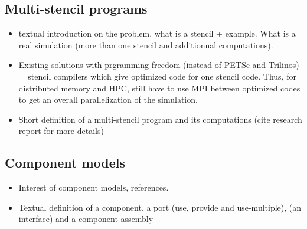 \subsection{Multi-stencil programs}
\label{sect:multistencil}
\begin{itemize}
\item textual introduction on the problem, what is a stencil + example. What is a real simulation (more than one stencil and additionnal computations). 
\item Existing solutions with prgramming freedom (instead of PETSc and Trilinos) = stencil compilers which give optimized code for one stencil code. Thus, for distributed memory and HPC, still have to use MPI between optimized codes to get an overall parallelization of the simulation.
\item Short definition of a multi-stencil program and its computations (cite research report for more details)
\end{itemize}

\subsection{Component models}
\begin{itemize}
\item Interest of component models, references.
\item Textual definition of a component, a port (use, provide and use-multiple), (an interface) and a component assembly
\end{itemize}

